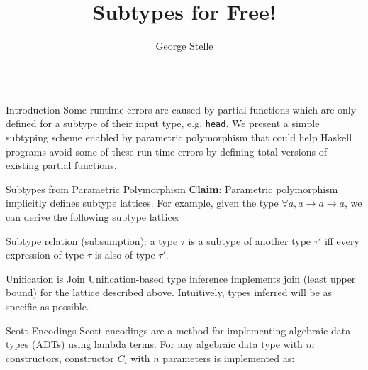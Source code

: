 \documentclass[final]{beamer}
\title{Subtypes for Free!}
\author{George Stelle}
\institute{Department of Computer Science \\ University of New Mexico}
\begin{document}
\begin{frame}[fragile]
\begin{columns}[t]
\begin{column}{.285\textwidth}

\begin{block}{Introduction}
\vspace{0.5cm}
Some runtime errors are caused by partial functions which are only defined for a
subtype of their input type, e.g. \texttt{head}. We present a simple subtyping
scheme enabled by parametric polymorphism that could help Haskell programs avoid
some of these run-time errors by defining total versions of existing partial
functions. 
\end{block}
\vspace{1cm}
\begin{block}{Subtypes from Parametric Polymorphism}
\vspace{0.5cm}
\textbf{Claim}: Parametric polymorphism implicitly defines subtype lattices. For example, given
the type $\forall a, a \rightarrow a \rightarrow a$, we can derive the following
subtype lattice:
\vspace{0.5cm}
\begin{figure}[!h]
\centering
{}
\end{figure}
Subtype relation (subsumption): a type $\tau$ is a subtype of another type $\tau'$ iff every
expression of type $\tau$ is also of type $\tau'$.
\end{block}
\vspace{1cm}
\begin{block}{Unification is Join}
\vspace{0.5cm}
Unification-based type inference implements join (least upper bound) for the
lattice described above. Intuitively, types inferred will be as specific as
possible. 
\end{block}
\vspace{1cm}
\begin{block}{Scott Encodings}
\vspace{0.5cm}
Scott encodings are a method for implementing algebraic data types (ADTs)
using lambda terms. For any algebraic data type with $m$ constructors,
constructor $C_i$ with $n$ parameters is implemented as:


\end{block}
\end{column}
\end{columns}
\end{frame}
\end{document}

